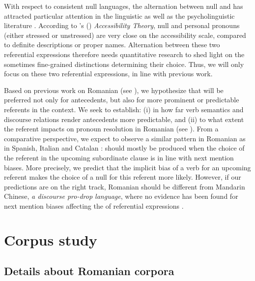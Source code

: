 \documentclass[output=paper,colorlinks,citecolor=brown]{langscibook}
\begin{document}
With respect to consistent null  languages, the alternation between null and  has attracted particular attention in the linguistic as well as the psycholinguistic literature \citep{carminati2002processing, chamorro2018offline,torregrossa2020variation, lindemann2020thematic, contemori2021microvariation}. According to \citeauthor{ariel1994interpreting}'s (\citeyear{ariel1994interpreting}) \textit{Accessibility Theory}, null and personal pronouns (either stressed or unstressed) are very close on the accessibility scale, compared to definite descriptions or proper names. Alternation between these two referential expressions therefore needs quantitative research to shed light on the sometimes fine-grained distinctions determining their choice.
Thus, we will only focus on these two referential expressions, in line with previous work.

Based on previous work on Romanian (see \citealt{lindemann2020thematic}), we hypothesize that  will be preferred not only for  antecedents, but also for more prominent or predictable referents in the context. We seek to establish: (i) in how far verb semantics and discourse relations render antecedents more predictable, and (ii) to what extent the referent  impacts on pronoun resolution in Romanian (see \citealt{demberg2023systematic}).
From a comparative perspective, we expect to observe a similar pattern in Romanian as in Spanish, Italian \citep{contemori2021microvariation} and Catalan \citep{mayol2018asymmetries}:  should mostly be produced when the choice of the referent in the upcoming subordinate clause is in line with next mention biases. More precisely, we predict that the implicit bias of a verb for an upcoming referent makes the choice of a null  for this referent more likely. 
However, if our predictions are on the right track, Romanian should be different from Mandarin Chinese, \textit{a discourse pro-drop language}, where no evidence has been found for next mention biases affecting the  of referential expressions \citep{hwang2022role}.

\section{Corpus study} 
\label{corpus:Istrate}
\subsection{Details about Romanian corpora}
\end{document}
